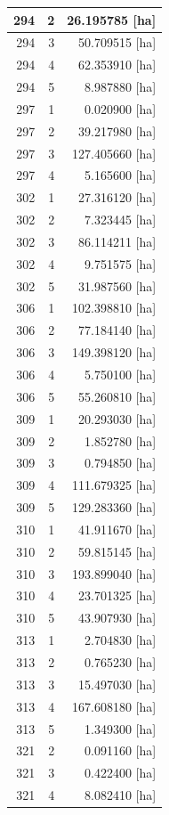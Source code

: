 \documentclass[11pt,]{book}
\begin{document}
\begin{table}
\begin{tabular}[t]{r|r|r}
\hline
294 & 2 & 26.195785 [ha]\\
\hline
294 & 3 & 50.709515 [ha]\\
\hline
294 & 4 & 62.353910 [ha]\\
\hline
294 & 5 & 8.987880 [ha]\\
\hline
297 & 1 & 0.020900 [ha]\\
\hline
297 & 2 & 39.217980 [ha]\\
\hline
297 & 3 & 127.405660 [ha]\\
\hline
297 & 4 & 5.165600 [ha]\\
\hline
302 & 1 & 27.316120 [ha]\\
\hline
302 & 2 & 7.323445 [ha]\\
\hline
302 & 3 & 86.114211 [ha]\\
\hline
302 & 4 & 9.751575 [ha]\\
\hline
302 & 5 & 31.987560 [ha]\\
\hline
306 & 1 & 102.398810 [ha]\\
\hline
306 & 2 & 77.184140 [ha]\\
\hline
306 & 3 & 149.398120 [ha]\\
\hline
306 & 4 & 5.750100 [ha]\\
\hline
306 & 5 & 55.260810 [ha]\\
\hline
309 & 1 & 20.293030 [ha]\\
\hline
309 & 2 & 1.852780 [ha]\\
\hline
309 & 3 & 0.794850 [ha]\\
\hline
309 & 4 & 111.679325 [ha]\\
\hline
309 & 5 & 129.283360 [ha]\\
\hline
310 & 1 & 41.911670 [ha]\\
\hline
310 & 2 & 59.815145 [ha]\\
\hline
310 & 3 & 193.899040 [ha]\\
\hline
310 & 4 & 23.701325 [ha]\\
\hline
310 & 5 & 43.907930 [ha]\\
\hline
313 & 1 & 2.704830 [ha]\\
\hline
313 & 2 & 0.765230 [ha]\\
\hline
313 & 3 & 15.497030 [ha]\\
\hline
313 & 4 & 167.608180 [ha]\\
\hline
313 & 5 & 1.349300 [ha]\\
\hline
321 & 2 & 0.091160 [ha]\\
\hline
321 & 3 & 0.422400 [ha]\\
\hline
321 & 4 & 8.082410 [ha]\\

\end{tabular}
\end{table}
\end{document}
